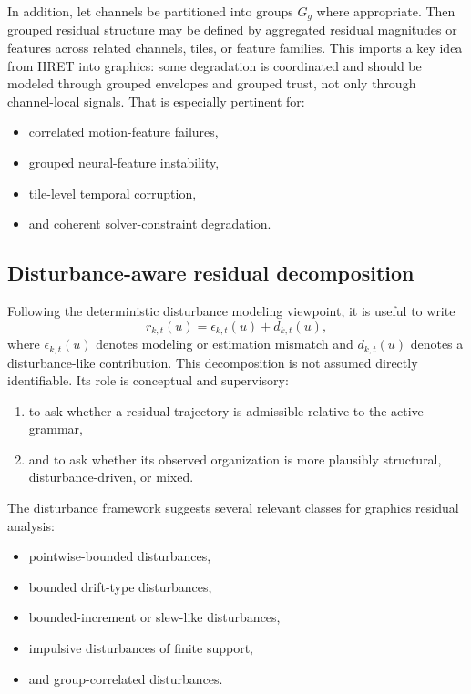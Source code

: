 \documentclass[11pt]{article}
\theoremstyle{definition}
\theoremstyle{plain}
\begin{document}
In addition, let channels be partitioned into groups $G_g$ where appropriate. Then grouped residual structure may be defined by aggregated residual magnitudes or features across related channels, tiles, or feature families. This imports a key idea from HRET into graphics: some degradation is coordinated and should be modeled through grouped envelopes and grouped trust, not only through channel-local signals. That is especially pertinent for:
\begin{itemize}[leftmargin=1.5em]
    \item correlated motion-feature failures,
    \item grouped neural-feature instability,
    \item tile-level temporal corruption,
    \item and coherent solver-constraint degradation.
\end{itemize}



\subsection{Disturbance-aware residual decomposition}

Following the deterministic disturbance modeling viewpoint, it is useful to write
\begin{equation}
r_{k,t}(u)=\epsilon_{k,t}(u)+d_{k,t}(u),
\end{equation}
where $\epsilon_{k,t}(u)$ denotes modeling or estimation mismatch and $d_{k,t}(u)$ denotes a disturbance-like contribution. This decomposition is not assumed directly identifiable. Its role is conceptual and supervisory:
\begin{enumerate}[leftmargin=1.5em]
    \item to ask whether a residual trajectory is admissible relative to the active grammar,
    \item and to ask whether its observed organization is more plausibly structural, disturbance-driven, or mixed.
\end{enumerate}

The disturbance framework suggests several relevant classes for graphics residual analysis:
\begin{itemize}[leftmargin=1.5em]
    \item pointwise-bounded disturbances,
    \item bounded drift-type disturbances,
    \item bounded-increment or slew-like disturbances,
    \item impulsive disturbances of finite support,
    \item and group-correlated disturbances.
\end{itemize}
\end{document}
